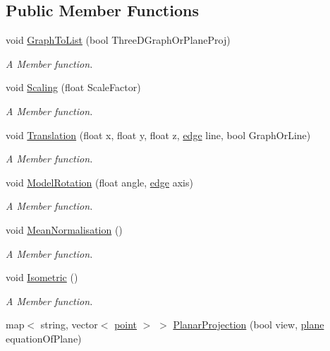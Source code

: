 \subsection*{Public Member Functions}
\begin{DoxyCompactItemize}
\item 
void \hyperlink{classThreeDGraph__class_a521cb31c72fa3828840a3bf4403e1395}{Graph\+To\+List} (bool Three\+D\+Graph\+Or\+Plane\+Proj)
\begin{DoxyCompactList}\small\item\em A Member function. \end{DoxyCompactList}\item 
void \hyperlink{classThreeDGraph__class_afa131e00002ddff96be961a903e2c589}{Scaling} (float Scale\+Factor)
\begin{DoxyCompactList}\small\item\em A Member function. \end{DoxyCompactList}\item 
void \hyperlink{classThreeDGraph__class_aa3f177ba316ff1fc411926ba9d08c80f}{Translation} (float x, float y, float z, \hyperlink{structedge}{edge} line, bool Graph\+Or\+Line)
\begin{DoxyCompactList}\small\item\em A Member function. \end{DoxyCompactList}\item 
void \hyperlink{classThreeDGraph__class_a400bececda29db8682455d92872f0a5e}{Model\+Rotation} (float angle, \hyperlink{structedge}{edge} axis)
\begin{DoxyCompactList}\small\item\em A Member function. \end{DoxyCompactList}\item 
void \hyperlink{classThreeDGraph__class_ad30f5f058cfe9a0de8a91dd062fb10c5}{Mean\+Normalisation} ()
\begin{DoxyCompactList}\small\item\em A Member function. \end{DoxyCompactList}\item 
void \hyperlink{classThreeDGraph__class_aec760645bb97742c87a50fe66aa68efe}{Isometric} ()
\begin{DoxyCompactList}\small\item\em A Member function. \end{DoxyCompactList}\item 
map$<$ string, vector$<$ \hyperlink{structpoint}{point} $>$ $>$ \hyperlink{classThreeDGraph__class_a7d36151c400305282da3656437b957ff}{Planar\+Projection} (bool view, \hyperlink{structplane}{plane} equation\+Of\+Plane)

\end{DoxyCompactItemize}

